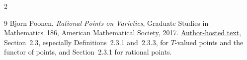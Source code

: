 \documentclass[12pt]{memoir}
\begin{document}
\begin{multicols}{2}
\begin{thebibliography}{9}
Bjorn Poonen, \emph{Rational Points on Varieties}, Graduate Studies in
Mathematics~186, American Mathematical Society, 2017.
\href{https://math.mit.edu/~poonen/papers/Qpoints.pdf}{Author-hosted text},
Section~2.3, especially Definitions~2.3.1 and~2.3.3, for $T$-valued
points and the functor of points, and Section~2.3.1 for rational points.
\end{thebibliography}

\end{multicols}
\end{document}
